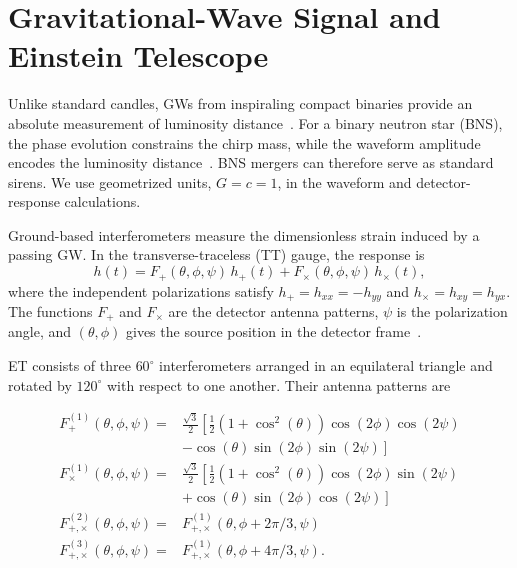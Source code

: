 \documentclass[
  aps,
  prd,
  twocolumn,
  nofootinbib,
  superscriptaddress,
  floatfix,
  longbibliography
]{revtex4-2}
\begin{document}
\section{Gravitational-Wave Signal and Einstein Telescope}
\label{sec:gw_signal}
Unlike standard candles, GWs from inspiraling compact binaries provide an
absolute measurement of luminosity distance~\cite{Schutz1986,HolzHughes2005}.
For a binary neutron star (BNS), the phase evolution constrains the chirp
mass, while the waveform amplitude encodes the luminosity
distance~\cite{Sathyaprakash_2009}. BNS mergers can therefore serve as
standard sirens. We use geometrized units, $G=c=1$, in the waveform and detector-response
calculations.

Ground-based interferometers measure the dimensionless strain induced by a
passing GW\@. In the transverse-traceless (TT) gauge, the response is
\begin{equation}
h(t)
=
F_{+}(\theta,\phi,\psi)\, h_{+}(t)
+
F_{\times}(\theta,\phi,\psi)\, h_{\times}(t),
\end{equation}
where the independent polarizations satisfy $h_{+}=h_{xx}=-h_{yy}$ and
$h_{\times}=h_{xy}=h_{yx}$. The functions $F_{+}$ and $F_{\times}$ are
the detector antenna patterns, $\psi$ is the polarization angle, and
$(\theta,\phi)$ gives the source position in the detector
frame~\cite{Cai_2017}.

ET consists of three $60^\circ$ interferometers arranged in an equilateral
triangle and rotated by $120^\circ$ with respect to one another. Their
antenna patterns are~\cite{Zhao2011}

\begin{equation}
\begin{aligned}
F_{+}^{(1)}(\theta, \phi, \psi)= & \frac{\sqrt{3}}{2}\left[\frac{1}{2}\left(1+\cos ^2(\theta)\right) \cos (2 \phi) \cos (2 \psi)\right. \\
& \left.-\cos (\theta) \sin (2 \phi) \sin (2 \psi)\right] \\
F_{\times}^{(1)}(\theta, \phi, \psi)= & \frac{\sqrt{3}}{2}\left[\frac{1}{2}\left(1+\cos ^2(\theta)\right) \cos (2 \phi) \sin (2 \psi)\right. \\
& \left.+\cos (\theta) \sin (2 \phi) \cos (2 \psi)\right] \\
F_{+, \times}^{(2)}(\theta, \phi, \psi)= & F_{+, \times}^{(1)}(\theta, \phi+2 \pi / 3, \psi) \\
F_{+, \times}^{(3)}(\theta, \phi, \psi)= & F_{+, \times}^{(1)}(\theta, \phi+4 \pi / 3, \psi).
\end{aligned}
\end{equation}
\end{document}
